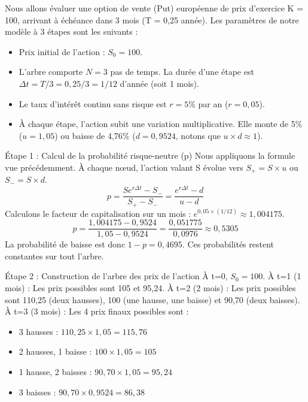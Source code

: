 \begin{examplebox}
Nous allons évaluer une option de vente (Put) européenne de prix d'exercice K = 100, arrivant à échéance dans 3 mois (T = 0,25 année). 
Les paramètres de notre modèle à 3 étapes sont les suivants :
\begin{itemize}[label=$\cdot$]
    \item Prix initial de l'action : $S_0 = 100$.
    \item L'arbre comporte $N = 3$ pas de temps. La durée d'une étape est $\Delta t = T / 3 = 0,25 / 3 = 1/12$ d'année (soit 1 mois).
    \item Le taux d'intérêt continu sans risque est $r = 5\%$ par an ($r = 0,05$).
    \item À chaque étape, l'action subit une variation multiplicative. Elle monte de 5\% ($u = 1,05$) ou baisse de 4,76\% ($d = 0,9524$, notons que $u \times d \approx 1$).
\end{itemize}

Étape 1 : Calcul de la probabilité risque-neutre (p)
Nous appliquons la formule vue précédemment. À chaque nœud, l'action valant S évolue vers $S_+ = S \times u$ ou $S_- = S \times d$.
\begin{equation*}
    p = \frac{S e^{r\Delta t} - S_-}{S_+ - S_-} = \frac{e^{r\Delta t} - d}{u - d}
\end{equation*}
Calculons le facteur de capitalisation sur un mois : $e^{0,05 \times (1/12)} \approx 1,004175$.
\begin{equation*}
    p = \frac{1,004175 - 0,9524}{1,05 - 0,9524} = \frac{0,051775}{0,0976} \approx 0,5305
\end{equation*}
La probabilité de baisse est donc $1 - p = 0,4695$. Ces probabilités restent constantes sur tout l'arbre.

Étape 2 : Construction de l'arbre des prix de l'action
À t=0, $S_0 = 100$.
À t=1 (1 mois) : Les prix possibles sont 105 et 95,24.
À t=2 (2 mois) : Les prix possibles sont 110,25 (deux hausses), 100 (une hausse, une baisse) et 90,70 (deux baisses).
À t=3 (3 mois) : Les 4 prix finaux possibles sont :
\begin{itemize}[label=$\cdot$]
    \item 3 hausses : $110,25 \times 1,05 = 115,76$
    \item 2 hausses, 1 baisse : $100 \times 1,05 = 105$
    \item 1 hausse, 2 baisses : $90,70 \times 1,05 = 95,24$
    \item 3 baisses : $90,70 \times 0,9524 = 86,38$
\end{itemize}


\end{examplebox}
